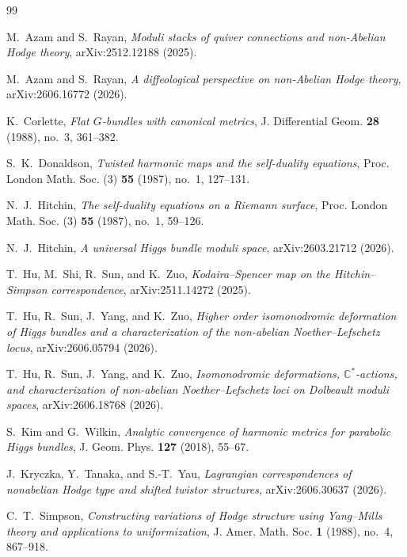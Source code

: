 \documentclass[11pt,reqno]{amsart}
\theoremstyle{definition}
\theoremstyle{remark}
\newcommand{\C}{\mathbb C}
\begin{document}
\begin{thebibliography}{99}

M.~Azam and S.~Rayan,
\emph{Moduli stacks of quiver connections and non-Abelian Hodge theory},
arXiv:2512.12188 (2025).

M.~Azam and S.~Rayan,
\emph{A diffeological perspective on non-Abelian Hodge theory},
arXiv:2606.16772 (2026).

K.~Corlette,
\emph{Flat $G$-bundles with canonical metrics},
J. Differential Geom. \textbf{28} (1988), no.~3, 361--382.

S.~K.~Donaldson,
\emph{Twisted harmonic maps and the self-duality equations},
Proc. London Math. Soc. (3) \textbf{55} (1987), no.~1, 127--131.

N.~J.~Hitchin,
\emph{The self-duality equations on a Riemann surface},
Proc. London Math. Soc. (3) \textbf{55} (1987), no.~1, 59--126.

N.~J.~Hitchin,
\emph{A universal Higgs bundle moduli space},
arXiv:2603.21712 (2026).

T.~Hu, M.~Shi, R.~Sun, and K.~Zuo,
\emph{Kodaira--Spencer map on the Hitchin--Simpson correspondence},
arXiv:2511.14272 (2025).

T.~Hu, R.~Sun, J.~Yang, and K.~Zuo,
\emph{Higher order isomonodromic deformation of Higgs bundles and a characterization of the non-abelian Noether--Lefschetz locus},
arXiv:2606.05794 (2026).

T.~Hu, R.~Sun, J.~Yang, and K.~Zuo,
\emph{Isomonodromic deformations, $\C^*$-actions, and characterization of non-abelian Noether--Lefschetz loci on Dolbeault moduli spaces},
arXiv:2606.18768 (2026).

S.~Kim and G.~Wilkin,
\emph{Analytic convergence of harmonic metrics for parabolic Higgs bundles},
J. Geom. Phys. \textbf{127} (2018), 55--67.

J.~Kryczka, Y.~Tanaka, and S.-T.~Yau,
\emph{Lagrangian correspondences of nonabelian Hodge type and shifted twistor structures},
arXiv:2606.30637 (2026).

C.~T.~Simpson,
\emph{Constructing variations of Hodge structure using Yang--Mills theory and applications to uniformization},
J. Amer. Math. Soc. \textbf{1} (1988), no.~4, 867--918.


\end{thebibliography}
\end{document}
